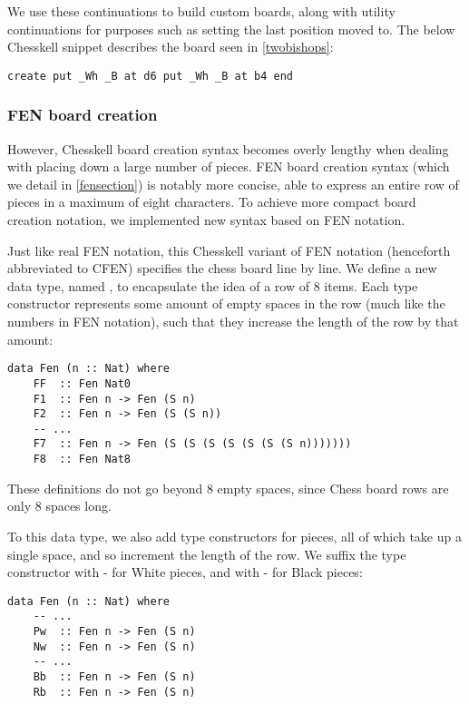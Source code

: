 We use these continuations to build custom boards, along with utility continuations for purposes such as setting the last position moved to. The below Chesskell snippet describes the board seen in \cref{twobishops}:

\begin{lstlisting}
create put _Wh _B at d6 put _Wh _B at b4 end
\end{lstlisting}

\subsubsection{FEN board creation}

However, Chesskell board creation syntax becomes overly lengthy when dealing with placing down a large number of pieces. FEN board creation syntax (which we detail in \cref{fensection}) is notably more concise, able to express an entire row of pieces in a maximum of eight characters. To achieve more compact board creation notation, we implemented new syntax based on FEN notation.

Just like real FEN notation, this Chesskell variant of FEN notation (henceforth abbreviated to CFEN) specifies the chess board line by line. We define a new data type, named , to encapsulate the idea of a row of 8 items. Each type constructor represents some amount of empty spaces in the row (much like the numbers in FEN notation), such that they increase the length of the row by that amount:

\begin{lstlisting}
data Fen (n :: Nat) where
    FF  :: Fen Nat0
    F1  :: Fen n -> Fen (S n)
    F2  :: Fen n -> Fen (S (S n))
    -- ...
    F7  :: Fen n -> Fen (S (S (S (S (S (S (S n)))))))
    F8  :: Fen Nat8
\end{lstlisting}

These definitions do not go beyond 8 empty spaces, since Chess board rows are only 8 spaces long.

To this data type, we also add type constructors for pieces, all of which take up a single space, and so increment the length of the row. We suffix the type constructor with - for White pieces, and with - for Black pieces:

\begin{lstlisting}
data Fen (n :: Nat) where
    -- ...
    Pw  :: Fen n -> Fen (S n)
    Nw  :: Fen n -> Fen (S n)
    -- ...
    Bb  :: Fen n -> Fen (S n)
    Rb  :: Fen n -> Fen (S n)
\end{lstlisting}

